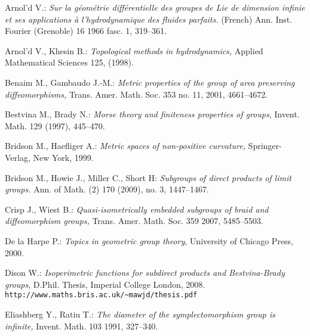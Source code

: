 \documentclass[a4paper,12pt]{amsart}
\theoremstyle{definition}
\begin{document}

\begin{thebibliography}{99}

Arnol'd V.:  \textit{Sur la g\'eom\'etrie diff\'erentielle des groupes de Lie de dimension
 infinie et ses applications \`a l'hydrodynamique des fluides parfaits.}
(French)  Ann. Inst. Fourier (Grenoble)  16  1966  fasc. 1, 319--361.

 Arnol'd V., Khesin B.: \textit{Topological methods in hydrodynamics,} Applied Mathematical
Sciences 125, (1998).


 Benaim M., Gambaudo J.-M.: \textit{Metric properties of the group of area preserving diffeomorphisms,}
Trans. Amer. Math. Soc. 353 no. 11, 2001, 4661--4672.

 Bestvina M., Brady N.: \textit{Morse theory and finiteness properties of groups},
Invent. Math. 129 (1997), 445--470.



 Bridson M., Haefliger A.: \textit{Metric spaces of non-positive curvature,} Springer-Verlag, New York, 1999.

Bridson M., Howie J., Miller C., Short H:
\textit{Subgroups of direct products of limit groups.}
 Ann. of Math. (2)  170  (2009),  no. 3, 1447--1467.

 Crisp J., Wiest B.: \textit{Quasi-isometrically embedded subgroups of braid and diffeomorphism groups,}
Trans. Amer. Math. Soc. 359 2007, 5485--5503.

 De la Harpe P.:
\textit{Topics in geometric group theory}, University of Chicago Press, 2000.

 Dison W.: \textit{Isoperimetric functions for subdirect products and Bestvina-Brady groups},
D.Phil. Thesis, Imperial College London, 2008.
{\tt http://www.maths.bris.ac.uk/\~{}mawjd/thesis.pdf}

 Eliashberg Y., Ratiu T.: \textit{The diameter of the symplectomorphism group is infinite,} Invent. Math. 103 1991, 327--340.


\end{thebibliography}
\end{document}
